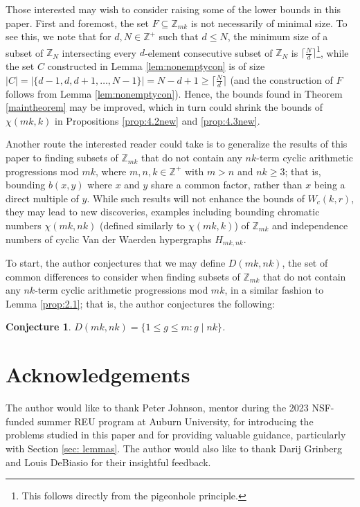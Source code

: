 \documentclass{article}
\newtheorem{conjecture}[theorem]{Conjecture}
\theoremstyle{definition}
\theoremstyle{remark}
\begin{document}
Those interested may wish to consider raising some of the lower bounds in this paper. First and foremost, the set $F \subseteq \mathbb{Z}_{mk}$ is not necessarily of minimal size. To see this, we note that for $d,N \in \mathbb{Z}^+$ such that $d \leq N$, the minimum size of a subset of $\mathbb{Z}_{N}$ intersecting every $d$-element consecutive subset of $\mathbb{Z}_{N}$ is $\lceil\frac{N}{d}\rceil$\footnote{This follows directly from the pigeonhole principle.}, while the set $C$ constructed in Lemma \ref{lem:nonemptycon} is of size $|C| = |\{d-1,d,d+1,\ldots,N-1\}| = N-d+1 \geq \lceil\frac{N}{d}\rceil$ (and the construction of $F$ follows from Lemma \ref{lem:nonemptycon}). Hence, the bounds found in Theorem \ref{maintheorem} may be improved, which in turn could shrink the bounds of $\chi(mk,k)$ in Propositions \ref{prop:4.2new} and \ref{prop:4.3new}.

Another route the interested reader could take is to generalize the results of this paper to finding subsets of $\mathbb{Z}_{mk}$ that do not contain any $nk$-term cyclic arithmetic progressions mod $mk$, where $m,n,k \in \mathbb{Z}^+$ with $m > n$ and $nk \geq 3$; that is, bounding $b(x,y)$ where $x$ and $y$ share a common factor, rather than $x$ being a direct multiple of $y$. While such results will not enhance the bounds of $W_{c}(k,r)$, they may lead to new discoveries, examples including bounding chromatic numbers $\chi(mk,nk)$ (defined similarly to $\chi(mk,k)$) of $\mathbb{Z}_{mk}$ and independence numbers of cyclic Van der Waerden hypergraphs $H_{mk,nk}$.

To start, the author conjectures that we may define $D(mk,nk)$, the set of common differences to consider when finding subsets of $\mathbb{Z}_{mk}$ that do not contain any $nk$-term cyclic arithmetic progressions mod $mk$, in a similar fashion to Lemma \ref{prop:2.1}; that is, the author conjectures the following:

\begin{conjecture}\label{conj:5.1}
    $D(mk,nk) = \{1 \leq g \leq m : g \mid nk\}$.
\end{conjecture}

\section*{Acknowledgements} The author would like to thank Peter Johnson, mentor during the 2023 NSF-funded summer REU program at Auburn University, for introducing the problems studied in this paper and for providing valuable guidance, particularly with Section \ref{sec: lemmas}. The author would also like to thank Darij Grinberg and Louis DeBiasio for their insightful feedback.
\end{document}
